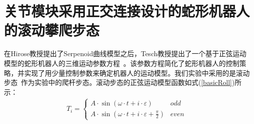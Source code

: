 \section{关节模块采用正交连接设计的蛇形机器人的滚动攀爬步态}
在Hirose教授提出了Serpenoid曲线模型之后，Tesch教授提出了一个基于正弦运动模型的蛇形机器人的三维运动参数方程~\cite{ChosetSine}。该参数方程简化了蛇形机器人的控制策略，并实现了用少量控制参数来确定机器人的运动模型。我们实验中采用的是滚动步态~\cite{Enner2013Motion}作为实验中的爬杆步态。滚动步态的正弦运动模型函数如式(\ref{basicRoll})所示：
\begin{eqnarray}\label{basicRoll}
T_i=\left\{
\begin{array}{lr}
A\cdot \sin (\omega \cdot t + i\cdot \varepsilon )&odd\\
A\cdot \sin (\omega \cdot t + i\cdot \varepsilon +  \frac{\pi}{2})&even
\end{array}
\right.
\end{eqnarray}
